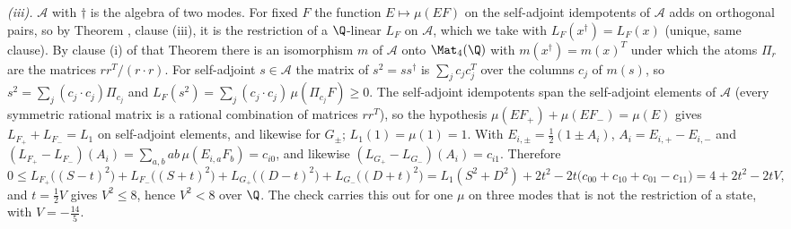 \emph{(iii).} $\mathcal{A}$ with $\dagger$ is the algebra of two modes. For fixed $F$ the function $E \mapsto \mu(EF)$ on the self-adjoint idempotents of $\mathcal{A}$ adds on orthogonal pairs, so by Theorem , clause (iii), it is the restriction of a $\Q$-linear $L_{F}$ on $\mathcal{A}$, which we take with $L_{F}(x^{\dagger}) = L_{F}(x)$ (unique, same clause). By clause (i) of that Theorem there is an isomorphism $m$ of $\mathcal{A}$ onto $\Mat_{4}(\Q)$ with $m(x^{\dagger}) = m(x)^{T}$ under which the atoms $\Pi_{r}$ are the matrices $rr^{T}/(r \cdot r)$. For self-adjoint $s \in \mathcal{A}$ the matrix of $s^{2} = ss^{\dagger}$ is $\sum_{j}c_{j}c_{j}^{T}$ over the columns $c_{j}$ of $m(s)$, so $s^{2} = \sum_{j}(c_{j} \cdot c_{j})\Pi_{c_{j}}$ and $L_{F}(s^{2}) = \sum_{j}(c_{j} \cdot c_{j})\,\mu(\Pi_{c_{j}}F) \ge 0$. The self-adjoint idempotents span the self-adjoint elements of $\mathcal{A}$ (every symmetric rational matrix is a rational combination of matrices $rr^{T}$), so the hypothesis $\mu(EF_{+}) + \mu(EF_{-}) = \mu(E)$ gives $L_{F_{+}} + L_{F_{-}} = L_{1}$ on self-adjoint elements, and likewise for $G_{\pm}$; $L_{1}(1) = \mu(1) = 1$. With $E_{i,\pm} = \tfrac12(1 \pm A_{i})$, $A_{i} = E_{i,+} - E_{i,-}$ and $(L_{F_{+}} - L_{F_{-}})(A_{i}) = \sum_{a,b}ab\,\mu(E_{i,a}F_{b}) = c_{i0}$, and likewise $(L_{G_{+}} - L_{G_{-}})(A_{i}) = c_{i1}$. Therefore
\[
0 \le L_{F_{+}}\bigl((S - t)^{2}\bigr) + L_{F_{-}}\bigl((S + t)^{2}\bigr) + L_{G_{+}}\bigl((D - t)^{2}\bigr) + L_{G_{-}}\bigl((D + t)^{2}\bigr) = L_{1}(S^{2} + D^{2}) + 2t^{2} - 2t\bigl(c_{00} + c_{10} + c_{01} - c_{11}\bigr) = 4 + 2t^{2} - 2tV ,
\]
and $t = \tfrac12 V$ gives $V^{2} \le 8$, hence $V^{2} < 8$ over $\Q$. The check carries this out for one $\mu$ on three modes that is not the restriction of a state, with $V = -\tfrac{14}{5}$.

